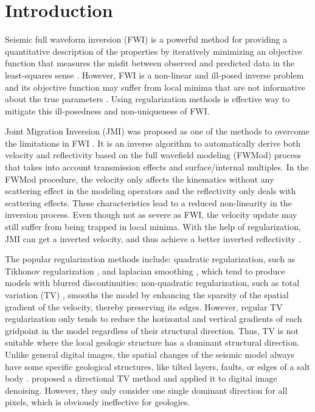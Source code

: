 \section{Introduction}
Seismic full waveform inversion (FWI) is a powerful method for providing a quantitative description of
the  properties by iteratively minimizing an objective function that measures the misfit between observed and predicted data in the least-squares sense \citep{tarantola1984inversion}. However, FWI is a non-linear and ill-posed inverse problem and its objective function may suffer from local minima that are not informative about the true parameters \citep{Virieux09,yangkang2016fwi,fu2017adaptive,fu2017discrepancy}. Using regularization methods is  effective way to mitigate this ill-posedness and non-uniqueness of FWI. 

Joint Migration Inversion (JMI) was proposed as one of the methods to overcome the  limitations in FWI \citep{Berkhout14b,Staalthesis,verschuur2016joint}. It is an inverse algorithm to automatically derive both velocity and reflectivity based on the full wavefield modeling (FWMod) process \citep{Berkhout14a} that takes into account transmission effects and surface/internal multiples. In the FWMod procedure, the velocity only affects the kinematics without any scattering effect in the modeling operators and the reflectivity only deals with scattering effects. These characteristics lead to a reduced non-linearity in the inversion process. Even though not as severe as FWI, the velocity update may still suffer from being trapped in local minima. With the help of regularization, JMI can get a  inverted velocity, and thus achieve a better inverted reflectivity \citep{qu161,qu2017i4d}.

The popular regularization methods include: quadratic  regularization, such as Tikhonov regularization \citep{Hu09}, and laplacian smoothing \citep{guitton2012constrained,qu162,qu2017simultaneous}, which tend to produce models with blurred discontinuities; non-quadratic  regularization, such as total variation (TV) \citep{anagaw2011full,qu161}, smooths the model by enhancing the sparsity of the spatial gradient of the velocity, thereby\old{,} preserving its edges. However, regular TV regularization only tends to reduce the horizontal and vertical gradients of each gridpoint in the model regardless of their structural direction. Thus, TV is not suitable where the local geologic structure has a dominant structural direction. Unlike general digital images, the spatial changes of the seismic model always have some specific geological structures, like tilted layers, faults, or edges of a salt body \citep{yangkang2017lsrtm,wujuan2018cg1,baimin2018cg,yangkang2018gji3}. \cite{bayram2012directional} proposed a directional TV method and applied it to digital image denoising. However, they only consider one single dominant direction for all pixels, which is obviously ineffective for  geologies. 

